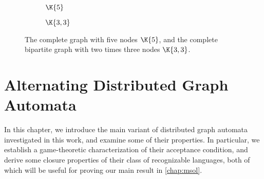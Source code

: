 \documentclass[a4paper,11pt,twoside]{report} \pdfoutput=1
\begin{document}
\begin{figure}[h]
  \alignpic
  \begin{subfigure}[b]{0.35\textwidth}
    \centering
         \caption{$\K{5}$}
    \label{fig:graph_k5}
  \end{subfigure}
  \begin{subfigure}[b]{0.35\textwidth}
    \centering
         \caption{$\K{3,3}$}
    \label{fig:graph_k3_3}
  \end{subfigure}
  \caption{The complete graph with five nodes $\K{5}$, and the
    complete bipartite graph with two times three nodes $\K{3,3}$.}
  \label{fig:graph_k5_and_k3_3}
\end{figure} 

\chapter{Alternating Distributed Graph Automata} \label{chap:adga}
In this chapter, we introduce the main variant of distributed graph
automata investigated in this work, and examine some of their
properties. In particular, we establish a game-theoretic
characterization of their acceptance condition, and derive some
closure properties of their class of recognizable languages, both of
which will be useful for proving our main result in \cref{chap:msol}.
\end{document}
